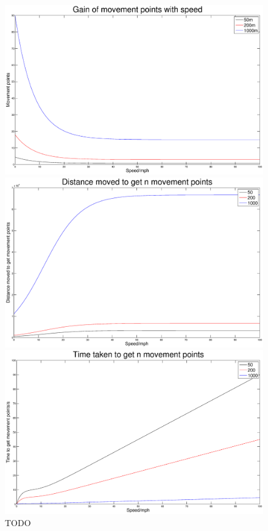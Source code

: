 \documentclass[12pt,a4paper,twoside]{article}
\begin{document}
\begin{figure}
\label{fig:movementeqn}
\centering
\begin{minipage}{0.5\linewidth}
\centering
\includegraphics[scale=0.18]{m1.eps}
\end{minipage}%
\begin{minipage}{0.5\linewidth}
\centering
\includegraphics[scale=0.18]{m2.eps}
\end{minipage}

\begin{center}
\includegraphics[scale=0.18]{m3.eps}
\end{center}
\caption{TODO}
\end{figure}
\end{document}
